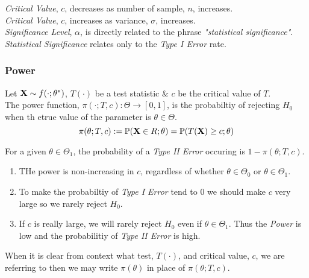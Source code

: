 \documentclass[11pt,a4paper]{article}
\begin{document}
\textit{Critical Value}, $c$, decreases as number of sample, $n$, increases.\\
\textit{Critical Value}, $c$, increases as variance, $\sigma$, increases.\\

\remark{}
\textit{Significance Level}, $\alpha$, is directly related to the phrase \textit{"statistical significance"}. \textit{Statistical Significance} relates only to the \textit{Type I Error} rate.

\subsubsection{Power}

Let $\textbf{X}\sim f(\cdot;\theta^*)$, $T(\cdot)$ be a test statistic \& $c$ be the critical value of $T$.\\
The power function, $\pi(\cdot;T,c):\Theta\to[0,1]$, is the probabiltiy of rejecting $H_0$ when th etrue value of the parameter is $\theta\in\Theta$.
$$\pi(\theta;T,c):=\mathbb{P}(\textbf{X}\in R;\theta)=\mathbb{P}(T(\textbf{X})\geq c;\theta)$$

\remark{}
For a given $\theta\in\Theta_1$, the probability of a \textit{Type II Error} occuring is $1-\pi(\theta;T,c)$.\\

\remarkk{}
\begin{enumerate}[label=\roman*)]
	\item THe power is non-increasing in $c$, regardless of whether $\theta\in\Theta_0$ or $\theta\in\Theta_1$.
	\item To make the probabiltiy of \textit{Type I Error} tend to 0 we should make $c$ very large so we rarely reject $H_0$.
	\item If $c$ is really large, we will rarely reject $H_0$ even if $\theta\in\Theta_1$. Thus the \textit{Power} is low and the probabilitiy of \textit{Type II Error} is high.
\end{enumerate}

\notation{}
When it is clear from context what test, $T(\cdot)$, and critical value, $c$, we are referring to then we may write $\pi(\theta)$ in place of $\pi(\theta;T,c)$.\\
\end{document}
